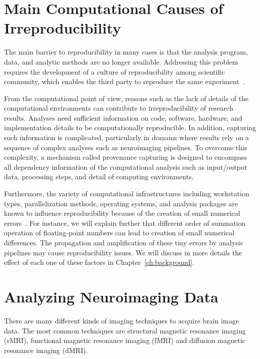 \section{Main Computational Causes of Irreproducibility} 

The main barrier to reproducibility in many cases is 
that the analysis program, data, and analytic methods are no longer 
available. Addressing this problem requires the development of a culture of 
reproducibility among scientific community, which enables the third 
party to reproduce the same experiment~\cite{peng2011reproducible, 
stodden2016enhancing}. 

From the computational point of view, reasons such as the lack of 
details of the computational environments can contribute to 
irreproducibility of research results. Analyses need sufficient 
information on code, software, hardware, and implementation details to 
be computationally reproducible. In addition, capturing such 
information is complicated, particularly in domains where results rely 
on a sequence of complex analyses such as neuroimaging pipelines. 
To overcome this complexity, a mechanism called provenance capturing is
designed to encompass all dependency information of the computational 
analysis such as input/output data, processing steps, and 
detail of computing environments. 

Furthermore, the variety of computational infrastructures including 
workstation types, parallelization methods, operating systems, and 
analysis packages are known to influence reproducibility because of the 
creation of small numerical errors~\cite{Gronenschild2012, 
diethelm2012limits, Glatard2015}. 
For instance, we will explain further that different order of 
summation operation of floating-point numbers can lead to creation of 
small numerical differences. 
The propagation and amplification of these tiny 
errors by analysis pipelines may cause reproducibility issues. We 
will discuss in more details the effect of each one of these factors in Chapter~\ref{ch:background}.

\section{Analyzing Neuroimaging Data}

There are many different kinds of imaging techniques to acquire 
brain image data. The most common techniques are structural magnetic 
resonance imaging (sMRI), functional magnetic resonance imaging (fMRI) 
and diffusion magnetic resonance imaging (dMRI).

